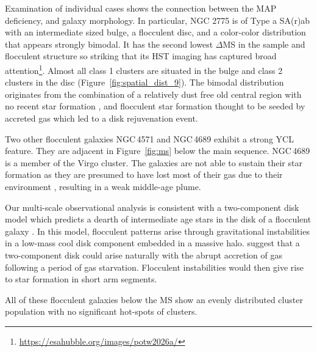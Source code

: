 \documentclass[linenumbers]{aastex63}
\begin{document}
{Examination of individual cases shows the connection between the MAP deficiency, and galaxy morphology. %
In particular, NGC 2775 is of Type a SA(r)ab with an intermediate sized bulge, a flocculent disc, and a color-color distribution that appears strongly bimodal.  It has the second lowest $\Delta$MS in the sample and flocculent structure so striking that its HST imaging has captured broad attention\footnote{\url{https://esahubble.org/images/potw2026a/}}. %
Almost all class 1 clusters are situated in the bulge and class 2 clusters in the disc (Figure~\ref{fig:spatial_dist_9}). The bimodal distribution originates from the combination of a relatively dust free old central region with no recent star formation \citep{hogg_hot_2001}, and flocculent star formation thought to be seeded by accreted gas \citep[i.e., from the nearby companion NGC\,2777,][]{arp_properties_1991} which led to a disk rejuvenation event. 

Two other flocculent galaxies NGC\,4571 \citep{kennicutt_evolution_1983} and NGC\,4689 \citep{elmegreen_arm_2002} exhibit a strong YCL feature. They are adjacent in Figure~\ref{fig:ms} below the main sequence.  NGC\,4689 is a member of the Virgo cluster. The galaxies are not able to sustain their star formation as they are presumed to have lost most of their gas due to their environment \citep{kenney_co_1986}, resulting in a weak middle-age plume.

Our multi-scale observational analysis is consistent with a two-component disk model which predicts a dearth of intermediate age stars in the disk of a flocculent galaxy \citep{ET93,SM22}.  In this model, flocculent patterns arise through gravitational instabilities in a low-mass cool disk component embedded in a massive halo. \citet{SM22} suggest that a two-component disk could arise naturally with the abrupt accretion of gas following a period of gas starvation. Flocculent instabilities would then give rise to star formation in short arm segments. 


All of these flocculent galaxies below the MS show an evenly distributed cluster population with no significant hot-spots of clusters. 


}
\end{document}

